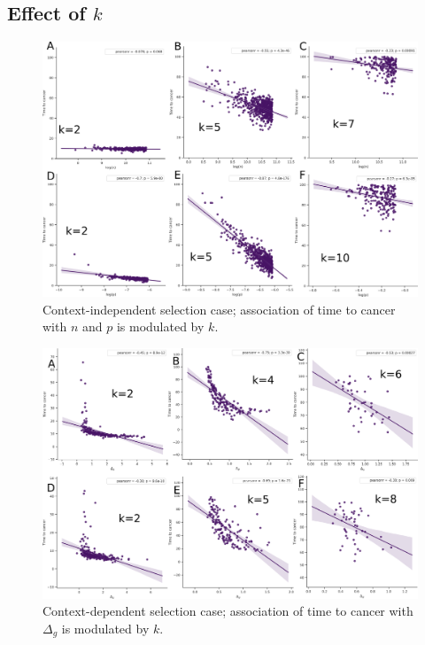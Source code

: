 \documentclass[a0,landscape]{a0poster}
\begin{document}
\begin{multicols}{3}
		\subsection{Effect of $k$}
			\begin{figure}[H]
			\centering
				\includegraphics[width=.8\linewidth, height=.4\linewidth]{fig7.png}
				\caption{Context-independent selection case; association of time to cancer with $n$ and $p$ is modulated by $k$.}
			\end{figure}
			\begin{figure}[H]
			\centering
				\includegraphics[width=.8\linewidth, height=.4\linewidth]{fig8.png}
				\caption{Context-dependent selection case; association of time to cancer with $\Delta_{g}$ is modulated by $k$.}
			\end{figure}


\end{multicols}
\end{document}
